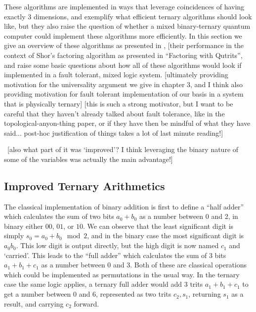 These algorithms are implemented in ways that leverage coincidences of having exactly 3 dimensions, and exemplify what efficient ternary algorithms should look like, but they also raise the question of whether a mixed binary-ternary quantum computer could implement these algorithms more efficiently. In this section we give an overview of these algorithms as presented in \cite{arithmetics}, [their performance in the context of Shor's factoring algorithm as presented in ``Factoring with Qutrits'', and raise some basic questions about how all of these algorithms would look if implemented in a fault tolerant, mixed logic system. [ultimately providing motivation for the universality argument we give in chapter 3, and I think also providing motivation for fault tolerant implementation of our basis in a system that is physically ternary] [this is such a strong motivator, but I want to be careful that they haven't already talked about fault tolerance, like in the topological-anyon-thing paper, or if they have then be mindful of what they have said... post-hoc justification of things takes a lot of last minute reading!]

\ [also what part of it was `improved'? I think leveraging the binary nature of some of the variables was actually the main advantage!]
\subsection{Improved Ternary Arithmetics}
The classical implementation of binary addition is first to define a ``half adder'' which calculates the sum of two bits $a_0 + b_0$ as a number between 0 and 2, in binary either $00$, $01$, or $10$. We can observe that the least significant digit is simply $s_0 = a_0 + b_0 \mod 2$, and in the binary case the most significant digit is $a_0b_0$. This low digit is output directly, but the high digit is now named $c_1$ and `carried'. This leads to the ``full adder'' which calculates the sum of 3 bits $a_1 + b_1 + c_1$ as a number between 0 and 3. Both of these are classical operations which could be implemented as permutations in the usual way. In the ternary case the same logic applies, a ternary full adder would add 3 trits $a_1 + b_1 + c_1$ to get a number between 0 and 6, represented as two trits $c_2, s_1$, returning $s_1$ as a result, and carrying $c_2$ forward.

